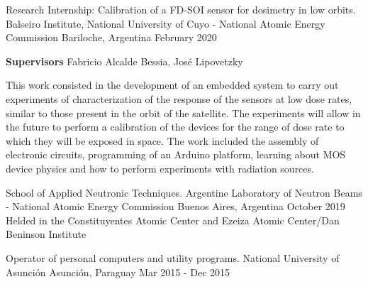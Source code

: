 \begin{cventries}
  \cventry
    {Research Internship: Calibration of a FD-SOI sensor for dosimetry in low orbits.} %
    {Balseiro Institute, National University of Cuyo - National Atomic Energy Commission} %
    {Bariloche, Argentina} %
    {February 2020} %
    {
      \begin{cvitems} %
        \item {\textbf{Supervisors} Fabricio Alcalde Bessia, José Lipovetzky}
        \item {This work consisted in the development of an embedded system to carry out experiments of characterization of the response of the sensors at low dose rates, similar to those present in the orbit of the satellite. The experiments will allow in the future to perform a calibration of the devices for the range of dose rate to which they will be exposed in space. The work included the assembly of electronic circuits, programming of an Arduino platform, learning about MOS device physics and how to perform experiments with radiation sources.}
      \end{cvitems}
    }
    
  \cventry
    {School of Applied Neutronic Techniques.} %
    {Argentine Laboratory of Neutron Beams - National Atomic Energy Commission} %
    {Buenos Aires, Argentina} %
    {October 2019} %
    {Helded in the Constituyentes Atomic Center and Ezeiza Atomic Center/Dan Beninson Institute}
        
  \cventry
    {Operator of personal computers and utility programs.} %
    {National University of Asunción} %
    {Asunción, Paraguay} %
    {Mar 2015 - Dec 2015} %
    { }
    
\end{cventries}
